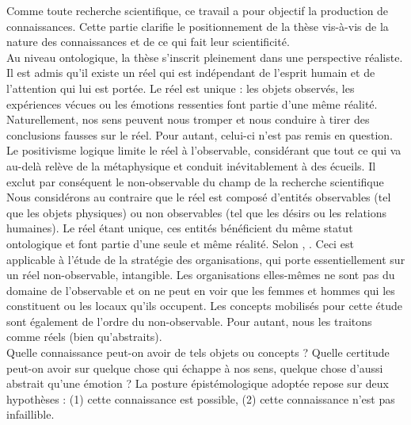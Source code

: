     
    Comme toute recherche scientifique, ce travail a pour objectif la production de connaissances. Cette partie clarifie le positionnement de la thèse vis-à-vis de la nature des connaissances et de ce qui fait leur scientificité. \\
    
    Au niveau ontologique, la thèse s’inscrit pleinement dans une perspective réaliste. Il est admis qu’il existe un réel qui est indépendant de l’esprit humain et de l’attention qui lui est portée. Le réel est unique : les objets observés, les expériences vécues ou les émotions ressenties font partie d’une même réalité. Naturellement, nos sens peuvent nous tromper et nous conduire à tirer des conclusions fausses sur le réel. Pour autant, celui-ci n’est pas remis en question. Le positivisme logique limite le réel à l’observable, considérant que tout ce qui va au-delà relève de la métaphysique et conduit inévitablement à des écueils. Il exclut par conséquent le non-observable du champ de la recherche scientifique Nous considérons au contraire que le réel est composé d’entités observables (tel que les objets physiques) ou non observables (tel que les désirs ou les relations humaines). Le réel étant unique, ces entités bénéficient du même statut ontologique et font partie d’une seule et même réalité. Selon \textcite{hunt1992for}, . Ceci est applicable à l’étude de la stratégie des organisations, qui porte essentiellement sur un réel non-observable, intangible. Les organisations elles-mêmes ne sont pas du domaine de l’observable et on ne peut en voir que les femmes et hommes qui les constituent ou les locaux qu’ils occupent. Les concepts mobilisés pour cette étude sont également de l’ordre du non-observable. Pour autant, nous les traitons comme réels (bien qu’abstraits).\\
    
    Quelle connaissance peut-on avoir de tels objets ou concepts ? Quelle certitude peut-on avoir sur quelque chose qui échappe à nos sens, quelque chose d’aussi abstrait qu’une émotion ? La posture épistémologique adoptée repose sur deux hypothèses : (1) cette connaissance est possible, (2) cette connaissance n’est pas infaillible. \\
    
